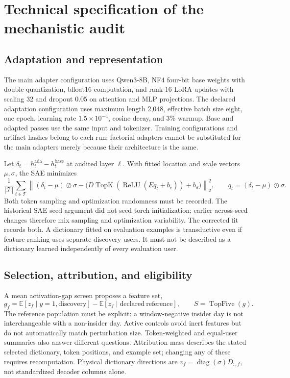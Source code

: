 \section{Technical specification of the mechanistic audit}
\label{sec:technical}
\subsection{Adaptation and representation}
The main adapter configuration uses Qwen3-8B, NF4 four-bit base weights with
double quantization, bfloat16 computation, and rank-16 LoRA updates with scaling
32 and dropout 0.05 on attention and MLP projections. The declared adaptation
configuration uses maximum length 2,048, effective batch size eight, one epoch,
learning rate $1.5\times10^{-4}$, cosine decay, and 3\% warmup. Base and adapted
passes use the same input and tokenizer. Training configurations and artifact
hashes belong to each run; factorial adapters cannot be substituted for the
main adapters merely because their architecture is the same.

Let $\delta_t=h^{\mathrm{ada}}_t-h^{\mathrm{base}}_t$ at audited layer $\ell$.
With fitted location and scale vectors $\mu,\sigma$, the SAE minimizes
\begin{equation}
 \frac{1}{|\mathcal T|}\sum_{t\in\mathcal T}
 \left\|(\delta_t-\mu)\oslash\sigma-
       \bigl(D\operatorname{TopK}(\operatorname{ReLU}(E q_t+b_e))+b_d\bigr)\right\|_2^2,
 \qquad q_t=(\delta_t-\mu)\oslash\sigma.
\end{equation}
Both token sampling and optimization randomness must be recorded. The historical
SAE seed argument did not seed torch initialization; earlier across-seed changes
therefore mix sampling and optimization variability. The corrected fit records
both. A dictionary fitted on evaluation examples is transductive even if feature
ranking uses separate discovery users. It must not be described as a dictionary
learned independently of every evaluation user.

\subsection{Selection, attribution, and eligibility}
A mean activation-gap screen proposes a feature set,
\begin{equation}
 g_f=\mathbb E[z_f\mid y=1,\mathrm{discovery}]
       -\mathbb E[z_f\mid\mathrm{declared\ reference}],
 \qquad S=\operatorname{TopFive}(g).
\end{equation}
The reference population must be explicit: a window-negative insider day is not
interchangeable with a non-insider day. Active controls avoid inert features but
do not automatically match perturbation size. Token-weighted and equal-user
summaries also answer different questions. Attribution mass describes the stated
selected dictionary, token positions, and example set; changing any of these
requires recomputation. Physical dictionary directions are
$v_f=\operatorname{diag}(\sigma)D_{:,f}$, not standardized decoder columns alone.

